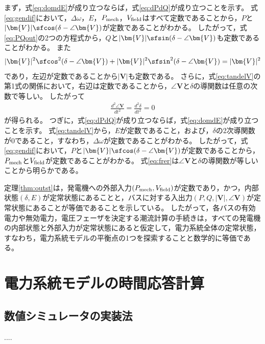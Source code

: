 \documentclass[tombow,dvipdfmx]{corona-a5-1.1}
\begin{document}
\begin{証明}
まず，式\ref{eq:domdE}が成り立つならば，式\ref{eq:dPdQ}が成り立つことを示す。
式\ref{eq:gendif}において，$\Delta \omega$，$E$，$P_{\rm mech}$，$V_{\rm field}$はすべて定数であることから，$P$と$|\bm{V}|\sfcos (\delta - \angle \bm{V})$が定数であることがわかる。
したがって，式\ref{eq:PQout}の2つの方程式から，$Q$と$|\bm{V}|\sfsin (\delta - \angle \bm{V})$も定数であることがわかる。
また
\begin{align*}
|\bm{V}|^2\sfcos^2 (\delta - \angle \bm{V}) +
|\bm{V}|^2\sfsin^2 (\delta - \angle \bm{V}) = |\bm{V}|^2
\end{align*}
であり，左辺が定数であることから$|\bm{V}|$も定数である。
さらに，式\ref{eq:tandelV}の第1式の関係において，右辺は定数であることから，$\angle \bm{V}$と$\delta$の導関数は任意の次数で等しい。
したがって
\begin{align*}
\frac{d^2 \angle \bm{V}}{dt^2} = \frac{d^2 \delta}{dt^2} =0
\end{align*}
が得られる。
つぎに，式\ref{eq:dPdQ}が成り立つならば，式\ref{eq:domdE}が成り立つことを示す。
式\ref{eq:tandelV}から，$E$が定数であること，および，$\delta$の2次導関数が$0$であること，すなわち，$\Delta \omega$が定数であることがわかる。
したがって，式\ref{eq:gendif}において，$P$と$|\bm{V}|\sfcos (\delta - \angle \bm{V})$が定数であることから，$P_{\rm mech}$と$V_{\rm field}$が定数であることがわかる。
式\ref{eq:frer}は$\angle \bm{V}$と$\delta$の導関数が等しいことから明らかである。
\end{証明}

定理\ref{thm:outst}は，発電機への外部入力$(P_{\rm mech},V_{\rm field})$が定数であり，かつ，内部状態$(\delta,E)$が定常状態にあることと，バスに対する入出力$(P,Q,|\bm{V}|,\angle \bm{V})$が定常状態にあることが等価であることを示している。
したがって，各バスの有効電力や無効電力，電圧フェーザを決定する潮流計算の手続きは，すべての発電機の内部状態と外部入力が定常状態にあると仮定して，電力系統全体の定常状態，すなわち，電力系統モデルの平衡点の1つを探索することと数学的に等価である。



\section{電力系統モデルの時間応答計算}\label{sec:numsimtr}

\subsection{数値シミュレータの実装法}
....
\end{document}
